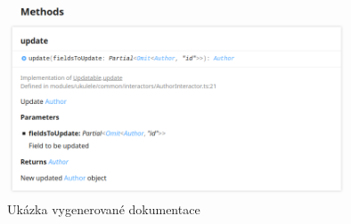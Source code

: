 \begin{figure}[h!]
    \centering
    \includegraphics[width=0.9\textwidth]{assets/author_documentation.png}
    \caption{Ukázka vygenerované dokumentace}
    \label{fig:documentation_example}
\end{figure}
